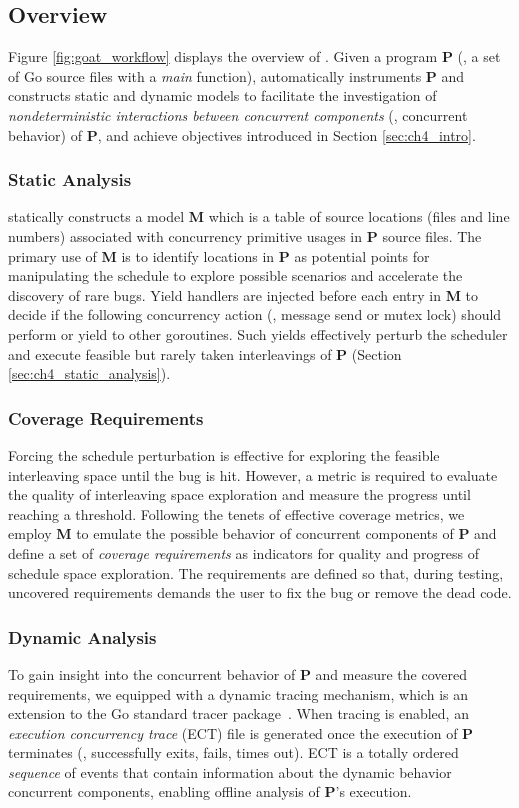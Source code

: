 \subsection{Overview}
\label{sec:ch4_overview}
Figure \ref{fig:goat_workflow} displays the overview of \goat.
%
Given a program \textbf{P} (\ie, a set of Go source files with a \textit{main} function), \goat automatically instruments \textbf{P} and constructs static and dynamic models to facilitate the investigation of \textit{nondeterministic interactions between concurrent components} (\ie, concurrent behavior) of \textbf{P}, and achieve objectives introduced in Section \ref{sec:ch4_intro}.
%

\subsubsection{Static Analysis}
\goat statically constructs a model \textbf{M} which is a table of source locations (files and line numbers) associated with concurrency primitive usages in \textbf{P} source files.
%
The primary use of \textbf{M} is to identify locations in \textbf{P} as potential points for manipulating the schedule to explore possible scenarios and accelerate the discovery of rare bugs.
%
Yield handlers are injected before each entry in \textbf{M} to decide if the following concurrency action (\eg, message send or mutex lock) should perform or yield to other goroutines.
%
Such yields effectively perturb the scheduler and execute feasible but rarely taken interleavings of \textbf{P} (Section \ref{sec:ch4_static_analysis}).
%

\subsubsection{Coverage Requirements}
Forcing the schedule perturbation is effective for exploring the feasible interleaving space until the bug is hit.
%
However, a metric is required to evaluate the quality of interleaving space exploration and measure the progress until reaching a threshold.
%
Following the tenets of effective coverage metrics, we employ \textbf{M} to emulate the possible behavior of concurrent components of \textbf{P} and define a set of \textit{coverage requirements} as indicators for quality and progress of schedule space exploration.
%
The requirements are defined so that, during testing, uncovered requirements demands the user to fix the bug or remove the dead code.

\subsubsection{Dynamic Analysis}
To gain insight into the concurrent behavior of \textbf{P} and measure the covered requirements, we equipped \goat with a dynamic tracing mechanism, which is an extension to the Go standard tracer package~\cite{go-cmd-trace}.
%
When tracing is enabled, an \textit{execution concurrency trace} (ECT) file is generated once the execution of \textbf{P} terminates (\eg, successfully exits, fails, times out).
%
ECT is a totally ordered \textit{sequence} of events that contain information about the dynamic behavior concurrent components, enabling offline analysis of \textbf{P}'s execution.

